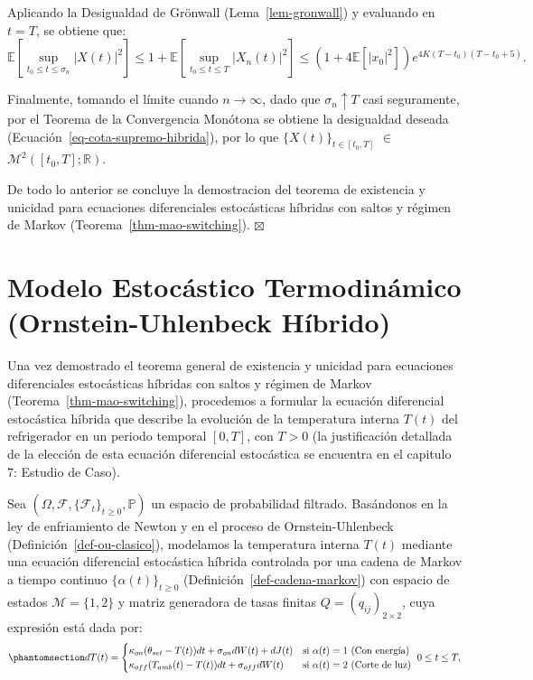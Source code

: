 \documentclass[
  spanish,
  us-letterpaper,
]{scrreprt}
\numberwithin{equation}{section}
\theoremstyle{plain}
\theoremstyle{plain}
\theoremstyle{definition}
\theoremstyle{plain}
\theoremstyle{remark}
\begin{document}
Aplicando la Desigualdad de Grönwall (Lema~\ref{lem-gronwall}) y
evaluando en \(t = T\), se obtiene que: \[
\mathbb{E}\left[ \sup_{t_0 \le t \le \sigma_n} \vert X(t) \vert^2 \right] \le 1 + \mathbb{E}\left[ \sup_{t_0 \le t \le T} \vert X_n(t) \vert^2 \right] \le \left( 1 + 4\mathbb{E}[\vert x_0 \vert^2] \right) e^{4K(T - t_0)(T - t_0 + 5)}.
\]

Finalmente, tomando el límite cuando \(n \to \infty\), dado que
\(\sigma_n \uparrow T\) casi seguramente, por el Teorema de la
Convergencia Monótona se obtiene la desigualdad deseada
(Ecuación~\ref{eq-cota-supremo-hibrida}), por lo que
\(\{X(t)\}_{t \in [t_0, T]}\) \(\in\)
\(\mathcal{M}^2([t_0, T]; \mathbb{R})\).

De todo lo anterior se concluye la demostracion del teorema de
existencia y unicidad para ecuaciones diferenciales estocásticas
híbridas con saltos y régimen de Markov
(Teorema~\ref{thm-mao-switching}). \(\boxtimes\)

\section{Modelo Estocástico Termodinámico (Ornstein-Uhlenbeck
Híbrido)}\label{modelo-estocuxe1stico-termodinuxe1mico-ornstein-uhlenbeck-huxedbrido}

Una vez demostrado el teorema general de existencia y unicidad para
ecuaciones diferenciales estocásticas híbridas con saltos y régimen de
Markov (Teorema~\ref{thm-mao-switching}), procedemos a formular la
ecuación diferencial estocástica híbrida que describe la evolución de la
temperatura interna \(T(t)\) del refrigerador en un periodo temporal
\([0, T]\), con \(T > 0\) (la justificación detallada de la elección de
esta ecuación diferencial estocástica se encuentra en el capitulo 7:
Estudio de Caso).

Sea \((\Omega, \mathcal{F}, \{\mathcal{F}_t\}_{t \ge 0}, \mathbb{P})\)
un espacio de probabilidad filtrado. Basándonos en la ley de
enfriamiento de Newton y en el proceso de Ornstein-Uhlenbeck
(Definición~\ref{def-ou-clasico}), modelamos la temperatura interna
\(T(t)\) mediante una ecuación diferencial estocástica híbrida
controlada por una cadena de Markov a tiempo continuo
\(\{\alpha(t)\}_{t \ge 0}\) (Definición~\ref{def-cadena-markov}) con
espacio de estados \(\mathcal{M} = \{1, 2\}\) y matriz generadora de
tasas finitas \(Q = (q_{ij})_{2 \times 2}\), cuya expresión está dada
por: \begin{equation}\phantomsection\label{eq-ede-operativa-teorica}{
dT(t) = 
\begin{cases} 
\kappa_{on}(\theta_{set} - T(t))dt + \sigma_{on}dW(t) + dJ(t) & \text{si } \alpha(t) = 1 \text{ (Con energía)} \\ 
\kappa_{off}(T_{amb}(t) - T(t))dt + \sigma_{off}dW(t) & \text{si } \alpha(t) = 2 \text{ (Corte de luz)} 
\end{cases} \ 0 \leq t \leq T,
}\end{equation}
\end{document}
